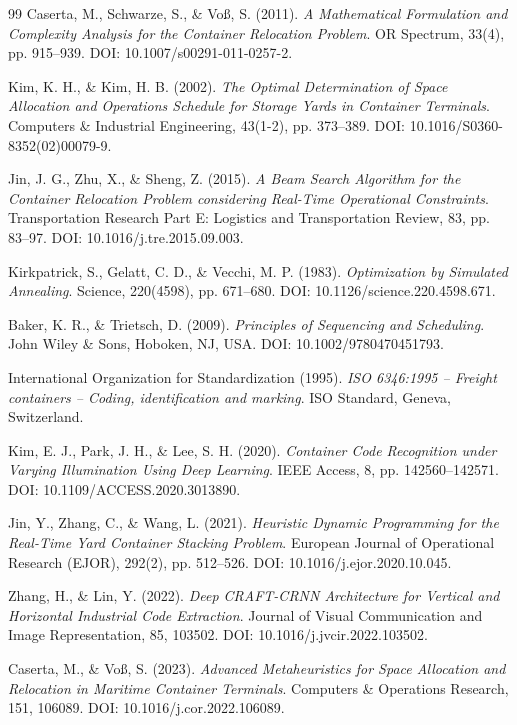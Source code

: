 \documentclass[12pt,a4paper]{article}
\begin{document}
\begin{thebibliography}{99}
Caserta, M., Schwarze, S., \& Voß, S. (2011).
\textit{A Mathematical Formulation and Complexity Analysis for the Container Relocation Problem}.
OR Spectrum, 33(4), pp. 915--939. DOI: 10.1007/s00291-011-0257-2.

Kim, K. H., \& Kim, H. B. (2002).
\textit{The Optimal Determination of Space Allocation and Operations Schedule for Storage Yards in Container Terminals}.
Computers \& Industrial Engineering, 43(1-2), pp. 373--389. DOI: 10.1016/S0360-8352(02)00079-9.

Jin, J. G., Zhu, X., \& Sheng, Z. (2015).
\textit{A Beam Search Algorithm for the Container Relocation Problem considering Real-Time Operational Constraints}.
Transportation Research Part E: Logistics and Transportation Review, 83, pp. 83--97. DOI: 10.1016/j.tre.2015.09.003.

Kirkpatrick, S., Gelatt, C. D., \& Vecchi, M. P. (1983).
\textit{Optimization by Simulated Annealing}.
Science, 220(4598), pp. 671--680. DOI: 10.1126/science.220.4598.671.

Baker, K. R., \& Trietsch, D. (2009).
\textit{Principles of Sequencing and Scheduling}.
John Wiley \& Sons, Hoboken, NJ, USA. DOI: 10.1002/9780470451793.

International Organization for Standardization (1995).
\textit{ISO 6346:1995 -- Freight containers -- Coding, identification and marking}.
ISO Standard, Geneva, Switzerland.

Kim, E. J., Park, J. H., \& Lee, S. H. (2020).
\textit{Container Code Recognition under Varying Illumination Using Deep Learning}.
IEEE Access, 8, pp. 142560--142571. DOI: 10.1109/ACCESS.2020.3013890.

Jin, Y., Zhang, C., \& Wang, L. (2021).
\textit{Heuristic Dynamic Programming for the Real-Time Yard Container Stacking Problem}.
European Journal of Operational Research (EJOR), 292(2), pp. 512--526. DOI: 10.1016/j.ejor.2020.10.045.

Zhang, H., \& Lin, Y. (2022).
\textit{Deep CRAFT-CRNN Architecture for Vertical and Horizontal Industrial Code Extraction}.
Journal of Visual Communication and Image Representation, 85, 103502. DOI: 10.1016/j.jvcir.2022.103502.

Caserta, M., \& Voß, S. (2023).
\textit{Advanced Metaheuristics for Space Allocation and Relocation in Maritime Container Terminals}.
Computers \& Operations Research, 151, 106089. DOI: 10.1016/j.cor.2022.106089.


\end{thebibliography}
\end{document}
